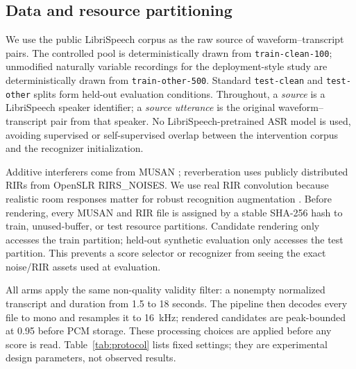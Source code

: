 \documentclass[10pt,twocolumn]{article}
\newcommand{\asr}{\textsc{ASR}}
\begin{document}
\subsection{Data and resource partitioning}

We use the public LibriSpeech corpus \citep{panayotov2015librispeech} as the raw source of waveform--transcript pairs. The controlled pool is deterministically drawn from \texttt{train-clean-100}; unmodified naturally variable recordings for the deployment-style study are deterministically drawn from \texttt{train-other-500}. Standard \texttt{test-clean} and \texttt{test-other} splits form held-out evaluation conditions. Throughout, a \emph{source} is a LibriSpeech speaker identifier; a \emph{source utterance} is the original waveform--transcript pair from that speaker. No LibriSpeech-pretrained \asr{} model is used, avoiding supervised or self-supervised overlap between the intervention corpus and the recognizer initialization.

Additive interferers come from MUSAN \citep{snyder2015musan}; reverberation uses publicly distributed RIRs from OpenSLR RIRS\_NOISES. We use real RIR convolution because realistic room responses matter for robust recognition augmentation \citep{ko2017reverb}. Before rendering, every MUSAN and RIR file is assigned by a stable SHA-256 hash to train, unused-buffer, or test resource partitions. Candidate rendering only accesses the train partition; held-out synthetic evaluation only accesses the test partition. This prevents a score selector or recognizer from seeing the exact noise/RIR assets used at evaluation.

All arms apply the same non-quality validity filter: a nonempty normalized transcript and duration from 1.5 to 18 seconds. The pipeline then decodes every file to mono and resamples it to 16~kHz; rendered candidates are peak-bounded at 0.95 before PCM storage. These processing choices are applied before any score is read. Table~\ref{tab:protocol} lists fixed settings; they are experimental design parameters, not observed results.
\end{document}
